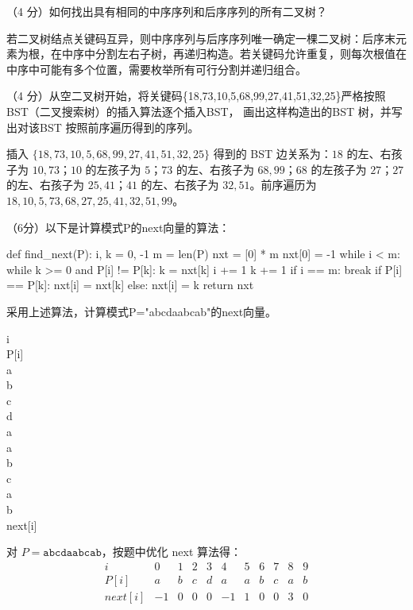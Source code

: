 \begin{question}
（4 分）如何找出具有相同的中序序列和后序序列的所有二叉树？
\begin{solution}
若二叉树结点关键码互异，则中序序列与后序序列唯一确定一棵二叉树：后序末元素为根，在中序中分割左右子树，再递归构造。若关键码允许重复，则每次根值在中序中可能有多个位置，需要枚举所有可行分割并递归组合。
\end{solution}
\end{question}

\begin{question}
（4 分）从空二叉树开始，将关键码\{18,73,10,5,68,99,27,41,51,32,25\}严格按照BST（二叉搜索树）的插入算法逐个插入BST， 画出这样构造出的BST 树，并写出对该BST 按照前序遍历得到的序列。
\begin{solution}
插入 $\{18,73,10,5,68,99,27,41,51,32,25\}$ 得到的 BST 边关系为：$18$ 的左、右孩子为 $10,73$；$10$ 的左孩子为 $5$；$73$ 的左、右孩子为 $68,99$；$68$ 的左孩子为 $27$；$27$ 的左、右孩子为 $25,41$；$41$ 的左、右孩子为 $32,51$。前序遍历为 $18,10,5,73,68,27,25,41,32,51,99$。
\end{solution}
\end{question}

\begin{question}
（6分）以下是计算模式P的next向量的算法：
\begin{pycode}
def find_next(P):
    i, k = 0, -1
    m = len(P)
    nxt = [0] * m
    nxt[0] = -1
    while i < m:
        while k >= 0 and P[i] != P[k]:
            k = nxt[k]
        i += 1
        k += 1
        if i == m:
            break
        if P[i] == P[k]:
            nxt[i] = nxt[k]
        else:
            nxt[i] = k
    return nxt
\end{pycode}
采用上述算法，计算模式P="abcdaabcab"的next向量。

i\\
P[i]\\
a\\
b\\
c\\
d\\
a\\
a\\
b\\
c\\
a\\
b\\
next[i]
\begin{solution}
对 $P=\texttt{abcdaabcab}$，按题中优化 next 算法得：
  \[
  \begin{array}{c|cccccccccc}
  i&0&1&2&3&4&5&6&7&8&9\\\hline
  P[i]&a&b&c&d&a&a&b&c&a&b\\
  next[i]&-1&0&0&0&-1&1&0&0&3&0
  \end{array}
  \]
\end{solution}
\end{question}

